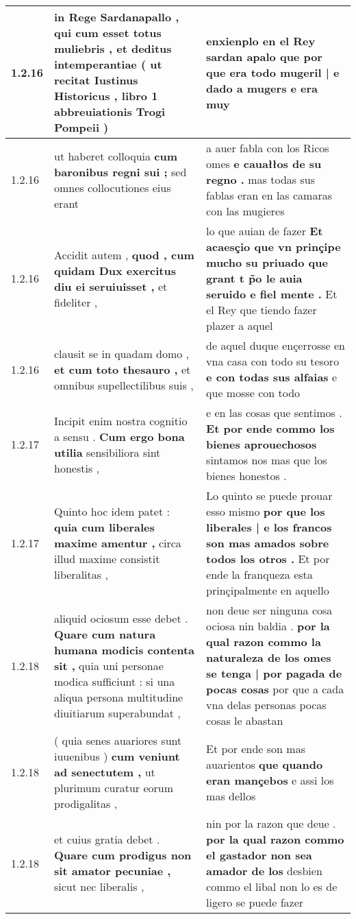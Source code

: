 \begin{tabular}{|p{1cm}|p{6.5cm}|p{6.5cm}|}
1.2.16 & in Rege Sardanapallo , \textbf{ qui cum esset totus muliebris , } et deditus intemperantiae ( ut recitat Iustinus Historicus , libro 1 abbreuiationis Trogi Pompeii ) & enxienplo en el Rey sardan \textbf{ apalo que por que era todo mugeril | e dado a mugers } e era muy \\\hline
1.2.16 & ut haberet colloquia \textbf{ cum baronibus regni sui ; } sed omnes collocutiones eius erant & a auer fabla con los Ricos omes \textbf{ e cauałłos de su regno . } mas todas sus fablas eran en las camaras con las mugieres \\\hline
1.2.16 & Accidit autem , \textbf{ quod , cum quidam Dux exercitus diu ei seruiuisset , } et fideliter , & lo que auian de fazer \textbf{ Et acaesçio que vn prinçipe mucho su priuado que grant t p̃o le auia seruido e fiel mente . } Et el Rey que tiendo fazer plazer a aquel \\\hline
1.2.16 & clausit se in quadam domo , \textbf{ et cum toto thesauro , } et omnibus supellectilibus suis , & de aquel duque ençerrosse en vna casa con todo su tesoro \textbf{ e con todas sus alfaias } e que mosse con todo \\\hline
1.2.17 & Incipit enim nostra cognitio a sensu . \textbf{ Cum ergo bona utilia } sensibiliora sint honestis , & e en las cosas que sentimos . \textbf{ Et por ende commo los bienes aprouechosos } sintamos nos mas que los bienes honestos . \\\hline
1.2.17 & Quinto hoc idem patet : \textbf{ quia cum liberales maxime amentur , } circa illud maxime consistit liberalitas , & Lo quinto se puede prouar esso mismo \textbf{ por que los liberales | e los francos son mas amados sobre todos los otros . } Et por ende la franqueza esta prinçipalmente en aquello \\\hline
1.2.18 & aliquid ociosum esse debet . \textbf{ Quare cum natura humana modicis contenta sit , } quia uni personae modica sufficiunt : si una aliqua persona multitudine diuitiarum superabundat , & non deue ser ninguna cosa ociosa nin baldia . \textbf{ por la qual razon commo la naturaleza de los omes se tenga | por pagada de pocas cosas } por que a cada vna delas personas pocas cosas le abastan \\\hline
1.2.18 & ( quia senes auariores sunt iuuenibus ) \textbf{ cum veniunt ad senectutem , } ut plurimum curatur eorum prodigalitas , & Et por ende son mas auarientos \textbf{ que quando eran mançebos } e assi los mas dellos \\\hline
1.2.18 & et cuius gratia debet . \textbf{ Quare cum prodigus non sit amator pecuniae , } sicut nec liberalis , & nin por la razon que deue . \textbf{ por la qual razon commo el gastador non sea amador de los } desbien commo el libal non lo es de ligero se puede fazer \\\hline

\end{tabular}
